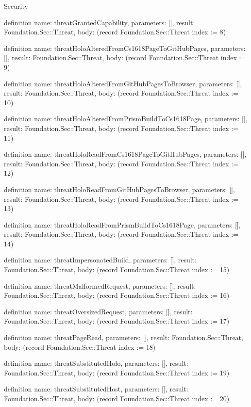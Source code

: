 \begin{lexlean}{Security}
\begin{semanticmodule}
definition{
  name: threatGrantedCapability,
  parameters: [],
  result: Foundation.Sec::Threat,
  body: (record Foundation.Sec::Threat {index := 8})
}

definition{
  name: threatHoloAlteredFromCs1618PageToGitHubPages,
  parameters: [],
  result: Foundation.Sec::Threat,
  body: (record Foundation.Sec::Threat {index := 9})
}

definition{
  name: threatHoloAlteredFromGitHubPagesToBrowser,
  parameters: [],
  result: Foundation.Sec::Threat,
  body: (record Foundation.Sec::Threat {index := 10})
}

definition{
  name: threatHoloAlteredFromPrismBuildToCs1618Page,
  parameters: [],
  result: Foundation.Sec::Threat,
  body: (record Foundation.Sec::Threat {index := 11})
}

definition{
  name: threatHoloReadFromCs1618PageToGitHubPages,
  parameters: [],
  result: Foundation.Sec::Threat,
  body: (record Foundation.Sec::Threat {index := 12})
}

definition{
  name: threatHoloReadFromGitHubPagesToBrowser,
  parameters: [],
  result: Foundation.Sec::Threat,
  body: (record Foundation.Sec::Threat {index := 13})
}

definition{
  name: threatHoloReadFromPrismBuildToCs1618Page,
  parameters: [],
  result: Foundation.Sec::Threat,
  body: (record Foundation.Sec::Threat {index := 14})
}

definition{
  name: threatImpersonatedBuild,
  parameters: [],
  result: Foundation.Sec::Threat,
  body: (record Foundation.Sec::Threat {index := 15})
}

definition{
  name: threatMalformedRequest,
  parameters: [],
  result: Foundation.Sec::Threat,
  body: (record Foundation.Sec::Threat {index := 16})
}

definition{
  name: threatOversizedRequest,
  parameters: [],
  result: Foundation.Sec::Threat,
  body: (record Foundation.Sec::Threat {index := 17})
}

definition{
  name: threatPageRead,
  parameters: [],
  result: Foundation.Sec::Threat,
  body: (record Foundation.Sec::Threat {index := 18})
}

definition{
  name: threatSubstitutedHolo,
  parameters: [],
  result: Foundation.Sec::Threat,
  body: (record Foundation.Sec::Threat {index := 19})
}

definition{
  name: threatSubstitutedHost,
  parameters: [],
  result: Foundation.Sec::Threat,
  body: (record Foundation.Sec::Threat {index := 20})
}


\end{semanticmodule}
\end{lexlean}
